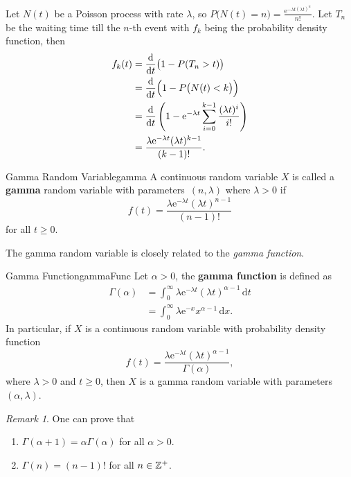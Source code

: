 \documentclass[math]{amznotes}
\theoremstyle{remark}
\newtheorem*{remark}{Remark}
\newcommand{\0}{\mathbf{0}}
\newcommand{\1}{\mathbf{1}}
\newcommand{\e}{\mathrm{e}}
\renewcommand{\d}{\mathrm{d}}
\begin{document}
Let $N(t)$ be a Poisson process with rate $\lambda$, so $P\bigl(N(t) = n\bigr) = \frac{\e^{-\lambda t\left(\lambda t\right)^n}}{n!}$. Let $T_n$ be the waiting time till the $n$-th event with $f_k$ being the probability density function, then
\begin{align*}
    f_k(t) & = \frac{\d}{\d t}\bigl(1 - P(T_n > t)\bigr) \\
    & = \frac{\d}{\d t}\Bigl(1 - P\bigl(N(t) < k\bigr)\Bigr) \\
    & = \frac{\d}{\d t}\left(1 - \e^{-\lambda t}\sum_{i = 0}^{k - 1}\frac{(\lambda t)^i}{i!}\right) \\
    & = \frac{\lambda\e^{-\lambda t}(\lambda t)^{k - 1}}{(k - 1)!}.
\end{align*}
\begin{dfnbox}{Gamma Random Variable}{gamma}
    A continuous random variable $X$ is called a {\color{red} \textbf{gamma}} random variable with parameters~$(n, \lambda)$ where $\lambda > 0$ if 
    \begin{equation*}
        f(t) = \frac{\lambda\e^{-\lambda t}(\lambda t)^{n - 1}}{(n - 1)!}
    \end{equation*}
    for all $t \geq 0$.
\end{dfnbox}
The gamma random variable is closely related to the \textit{gamma function}.
\begin{dfnbox}{Gamma Function}{gammaFunc}
    Let $\alpha > 0$, the {\color{red} \textbf{gamma function}} is defined as
    \begin{align*}
        \Gamma(\alpha) & = \int_{0}^{\infty}\!\lambda\e^{-\lambda t}(\lambda t)^{\alpha - 1}\,\d t \\
        & = \int_{0}^{\infty}\!\lambda\e^{-x}x^{\alpha - 1}\,\d x.
    \end{align*}
    In particular, if $X$ is a continuous random variable with probability density function
    \begin{equation*}
        f(t) = \frac{\lambda\e^{-\lambda t}(\lambda t)^{\alpha - 1}}{\Gamma(\alpha)},
    \end{equation*}
    where $\lambda > 0$ and $t \geq 0$, then $X$ is a gamma random variable with parameters $(\alpha, \lambda)$.
\end{dfnbox}
\begin{notebox}
    \begin{remark}
        One can prove that
        \begin{enumerate}
            \item $\Gamma(\alpha + 1) = \alpha\Gamma(\alpha)$ for all $\alpha > 0$.
            \item $\Gamma(n) = (n - 1)!$ for all $n \in \mathbb{Z}^+$.
        \end{enumerate}
    \end{remark}
\end{notebox}
\end{document}
